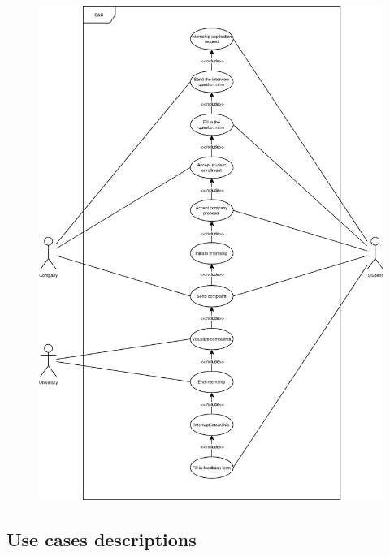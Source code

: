 \begin{figure}[H]
    \centering
    \includegraphics[width=0.8\linewidth]{../../assets/use-case-diagrams/internship-iter.png}
\end{figure}


\subsection{Use cases descriptions}

